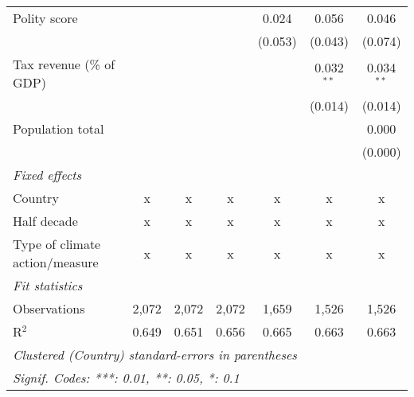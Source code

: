 \begin{tabular}{lcccccc}
   Polity score                                                &         &               &                & 0.024          & 0.056          & 0.046\\   
                                                               &         &               &                & (0.053)        & (0.043)        & (0.074)\\   
   Tax revenue (\% of GDP)                                     &         &               &                &                & 0.032$^{**}$   & 0.034$^{**}$\\   
                                                               &         &               &                &                & (0.014)        & (0.014)\\   
   Population total                                            &         &               &                &                &                & 0.000\\   
                                                               &         &               &                &                &                & (0.000)\\   
   \emph{Fixed effects}\\
   Country                                                     & x       & x             & x              & x              & x              & x\\  
   Half decade                                                 & x       & x             & x              & x              & x              & x\\  
   Type of climate action/measure                              & x       & x             & x              & x              & x              & x\\  
   \midrule \emph{Fit statistics}\\
   Observations                                                & 2,072   & 2,072         & 2,072          & 1,659          & 1,526          & 1,526\\  
   R$^2$                                                       & 0.649   & 0.651         & 0.656          & 0.665          & 0.663          & 0.663\\  
   \midrule
   \multicolumn{7}{l}{\emph{Clustered (Country) standard-errors in parentheses}}\\
   \multicolumn{7}{l}{\emph{Signif. Codes: ***: 0.01, **: 0.05, *: 0.1}}\\
\end{tabular}
\par\endgroup


